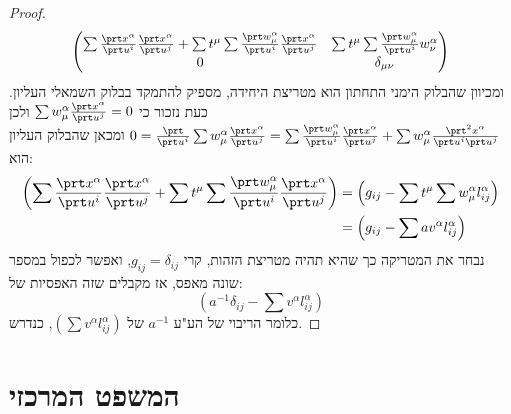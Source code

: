 \documentclass{article}
\theoremstyle{definition}
\begin{document}
\begin{proof}
\begin{equation*}
\begin{split}
\begin{pmatrix}
				\sum \frac{\prt x^\alpha}{\prt u^i} \frac{\prt x^\alpha}{\prt u^j} + \sum t^\mu \sum \frac{\prt w_\mu^\alpha}{\prt u^i} \frac{\prt x^\alpha}{\prt u^j}
				& \sum t^\mu \sum \frac{\prt w_\mu^\alpha}{\prt u^i} w^\alpha_\nu
				\\
				0
				& \delta_{\mu\nu}
			\end{pmatrix}
		\end{split}\end{equation*}
		ומכיוון שהבלוק הימני התחתון הוא מטריצת היחידה, מספיק להתמקד בבלוק השמאלי העליון.
		כעת נזכור כי
		\(
			\sum w_\mu^\alpha \frac{\prt x^\alpha}{\prt u^j}
			=0
		\)
		ולכן
		\(
			0
			=\frac{\prt}{\prt u^i} \sum w_\mu^\alpha \frac{\prt x^\alpha}{\prt u^j}
			=\sum \frac{\prt w_\mu^\alpha}{\prt u^i} \frac{\prt x^\alpha}{\prt u^j} + \sum w_\mu^\alpha \frac{\prt^2 x^\alpha}{\prt u^i \prt u^j}
		\)
		ומכאן שהבלוק העליון הוא:
		\begin{equation*}\begin{split}
			\left(\sum \frac{\prt x^\alpha}{\prt u^i} \frac{\prt x^\alpha}{\prt u^j} + \sum t^\mu \sum \frac{\prt w_\mu^\alpha}{\prt u^i} \frac{\prt x^\alpha}{\prt u^j}\right)
			&= \left(g_{ij} - \sum t^\mu \sum w_\mu^\alpha l^\alpha_{ij}\right)
			\\&= \left(g_{ij} - \sum a v^\alpha l^\alpha_{ij}\right)
		\end{split}\end{equation*}
		נבחר את המטריקה כך שהיא תהיה מטריצת הזהות, קרי
		\(g_{ij}=\delta_{ij}\),
		ואפשר לכפול במספר שונה מאפס, אז מקבלים שזה האפסיות של:
		\[
			\left(a^{-1} \delta_{ij} - \sum v^\alpha l^\alpha_{ij}\right)
		\]
		כלומר הריבוי של הע"ע
		\(a^{-1}\)
		של
		\(
			\left(\sum v^\alpha l^\alpha_{ij}\right)
		\),
		כנדרש.
	\end{proof}




	\section{המשפט המרכזי}
	
\end{document}
